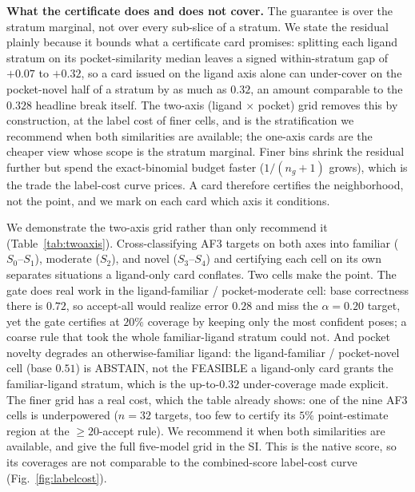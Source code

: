 \documentclass[10pt]{article}
\begin{document}
\textbf{What the certificate does and does not cover.} The guarantee is over the stratum marginal, not over
every sub-slice of a stratum. We state the residual plainly because it bounds what a certificate card
promises: splitting each ligand stratum on its pocket-similarity median leaves a signed within-stratum gap
of $+0.07$ to $+0.32$, so a card issued on the ligand axis alone can under-cover on the pocket-novel half of
a stratum by as much as $0.32$, an amount comparable to the $0.328$ headline break itself. The two-axis
(ligand $\times$ pocket) grid removes this by construction, at the label cost of finer cells, and is the
stratification we recommend when both similarities are available; the one-axis cards are the cheaper view
whose scope is the stratum marginal. Finer bins shrink the residual further but spend the exact-binomial
budget faster ($1/(n_g{+}1)$ grows), which is the trade the label-cost curve prices. A card therefore
certifies the neighborhood, not the point, and we mark on each card which axis it conditions.

We demonstrate the two-axis grid rather than only recommend it (Table~\ref{tab:twoaxis}). Cross-classifying
AF3 targets on both axes into familiar ($S_0$--$S_1$), moderate ($S_2$), and novel ($S_3$--$S_4$) and
certifying each cell on its own separates situations a ligand-only card conflates. Two cells make the point.
The gate does real work in the ligand-familiar / pocket-moderate cell: base correctness there is $0.72$, so
accept-all would realize error $0.28$ and miss the $\alpha=0.20$ target, yet the gate certifies at $20\%$
coverage by keeping only the most confident poses; a coarse rule that took the whole familiar-ligand stratum
could not. And pocket novelty degrades an otherwise-familiar ligand: the ligand-familiar / pocket-novel cell
(base $0.51$) is ABSTAIN, not the FEASIBLE a ligand-only card grants the familiar-ligand stratum, which is
the up-to-$0.32$ under-coverage made explicit. The finer grid has a real cost, which the table already shows: one of the nine AF3 cells is underpowered
($n=32$ targets, too few to certify its $5\%$ point-estimate region at the $\ge\!20$-accept rule). We
recommend it when both similarities are available, and give the full five-model grid in the SI. This is the native
score, so its coverages are not comparable to the combined-score label-cost curve (Fig.~\ref{fig:labelcost}).
\end{document}
